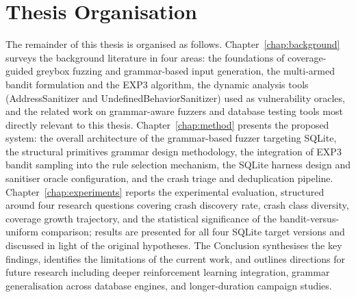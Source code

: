 \section{Thesis Organisation}

The remainder of this thesis is organised as follows. Chapter~\ref{chap:background} surveys the background literature in four areas: the foundations of coverage-guided greybox fuzzing and grammar-based input generation, the multi-armed bandit formulation and the EXP3 algorithm, the dynamic analysis tools (AddressSanitizer and UndefinedBehaviorSanitizer) used as vulnerability oracles, and the related work on grammar-aware fuzzers and database testing tools most directly relevant to this thesis. Chapter~\ref{chap:method} presents the proposed system: the overall architecture of the grammar-based fuzzer targeting SQLite, the structural primitives grammar design methodology, the integration of EXP3 bandit sampling into the rule selection mechanism, the SQLite harness design and sanitiser oracle configuration, and the crash triage and deduplication pipeline. Chapter~\ref{chap:experiments} reports the experimental evaluation, structured around four research questions covering crash discovery rate, crash class diversity, coverage growth trajectory, and the statistical significance of the bandit-versus-uniform comparison; results are presented for all four SQLite target versions and discussed in light of the original hypotheses. The Conclusion synthesises the key findings, identifies the limitations of the current work, and outlines directions for future research including deeper reinforcement learning integration, grammar generalisation across database engines, and longer-duration campaign studies.
